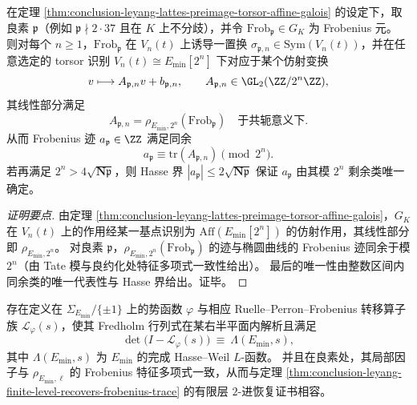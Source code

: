 \begin{theorem}\label{thm:conclusion-leyang-finite-level-recovers-frobenius-trace}
在定理 \ref{thm:conclusion-leyang-lattes-preimage-torsor-affine-galois} 的设定下，取良素 \(\mathfrak p\)（例如 \(\mathfrak p\nmid 2\cdot 37\) 且在 \(K\) 上不分歧），并令 \(\mathrm{Frob}_{\mathfrak p}\in G_K\) 为 Frobenius 元。
则对每个 \(n\ge 1\)，\(\mathrm{Frob}_{\mathfrak p}\) 在 \(V_n(t)\) 上诱导一置换 \(\sigma_{\mathfrak p,n}\in \mathrm{Sym}(V_n(t))\)，并在任意选定的 torsor 识别 \(V_n(t)\cong E_{\min}[2^n]\) 下对应于某个仿射变换
\[
v\longmapsto A_{\mathfrak p,n}v+b_{\mathfrak p,n},
\qquad
A_{\mathfrak p,n}\in \GL_2(\ZZ/2^n\ZZ),
\]
其线性部分满足
\[
A_{\mathfrak p,n}=\rho_{E_{\min},2^n}(\mathrm{Frob}_{\mathfrak p})
\quad\text{于共轭意义下}.
\]
从而 Frobenius 迹 \(a_{\mathfrak p}\in\ZZ\) 满足同余
\[
\boxed{\;
a_{\mathfrak p}\equiv \mathrm{tr}(A_{\mathfrak p,n})\pmod{2^n}. \;}
\]
若再满足 \(2^n>4\sqrt{\mathbf N\mathfrak p}\)，则 Hasse 界 \(|a_{\mathfrak p}|\le 2\sqrt{\mathbf N\mathfrak p}\) 保证 \(a_{\mathfrak p}\) 由其模 \(2^n\) 剩余类唯一确定。
\end{theorem}
\begin{proof}[证明要点]
由定理 \ref{thm:conclusion-leyang-lattes-preimage-torsor-affine-galois}，\(G_K\) 在 \(V_n(t)\) 上的作用经某一基点识别为 \(\mathrm{Aff}(E_{\min}[2^n])\) 的仿射作用，其线性部分即 \(\rho_{E_{\min},2^n}\)。
对良素 \(\mathfrak p\)，\(\rho_{E_{\min},2^n}(\mathrm{Frob}_{\mathfrak p})\) 的迹与椭圆曲线的 Frobenius 迹同余于模 \(2^n\)（由 Tate 模与良约化处特征多项式一致性给出）。
最后的唯一性由整数区间内同余类的唯一代表性与 Hasse 界给出。证毕。
\end{proof}

\begin{conjecture}\label{conj:conclusion-leyang-lattes-determinant-principle}
存在定义在 \(\Sigma_{E_{\min}}/\{\pm1\}\) 上的势函数 \(\varphi\) 与相应 Ruelle--Perron--Frobenius 转移算子族 \(\mathcal L_{\varphi}(s)\)，使其 Fredholm 行列式在某右半平面内解析且满足
\[
\det\!\bigl(I-\mathcal L_{\varphi}(s)\bigr)\ \equiv\ \Lambda(E_{\min},s),
\]
其中 \(\Lambda(E_{\min},s)\) 为 \(E_{\min}\) 的完成 Hasse--Weil \(L\)-函数。
并且在良素处，其局部因子与 \(\rho_{E_{\min},\ell}\) 的 Frobenius 特征多项式一致，从而与定理 \ref{thm:conclusion-leyang-finite-level-recovers-frobenius-trace} 的有限层 \(2\)-进恢复证书相容。
\end{conjecture}

\endinput
